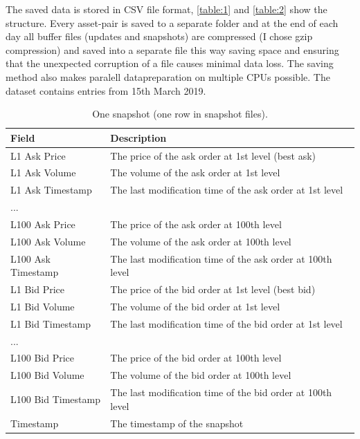 \documentclass[11pt,a4paper,oneside]{article}
\begin{document}
The saved data is stored in CSV file format, \autoref{table:1} and \autoref{table:2} show the structure. Every 
asset-pair is saved to a separate folder and at the end of each day all buffer files (updates and snapshots) are 
compressed (I chose gzip compression) and saved into a separate file this way saving space and ensuring that the 
unexpected corruption of a file causes minimal data loss. The saving method also makes paralell datapreparation on 
multiple CPUs possible. The dataset contains entries from 15th March 2019.

\begin{table}[tbh]
  \centering
  \begin{tabular}{|l|l|}
    \hline
    Field              & Description \\
    \hline
    L1 Ask Price       & The price of the ask order at 1st level (best ask) \\
    \hline
    L1 Ask Volume      & The volume of the ask order at 1st level \\
    \hline
    L1 Ask Timestamp   & The last modification time of the ask order at 1st level \\
    \hline
    ... \\
    \hline
    L100 Ask Price     & The price of the ask order at 100th level \\
    \hline
    L100 Ask Volume    & The volume of the ask order at 100th level \\
    \hline
    L100 Ask Timestamp & The last modification time of the ask order at 100th level \\
    \hline
    L1 Bid Price       & The price of the bid order at 1st level (best bid) \\
    \hline
    L1 Bid Volume      & The volume of the bid order at 1st level \\
    \hline
    L1 Bid Timestamp   & The last modification time of the bid order at 1st level \\
    \hline
    ... \\
    \hline
    L100 Bid Price     & The price of the bid order at 100th level \\
    \hline
    L100 Bid Volume    & The volume of the bid order at 100th level \\
    \hline
    L100 Bid Timestamp & The last modification time of the bid order at 100th level \\
    \hline
    Timestamp          & The timestamp of the snapshot \\
    \hline
  \end{tabular}
  \caption{One snapshot (one row in snapshot files).}
  \label{table:1}
\end{table}
\end{document}
